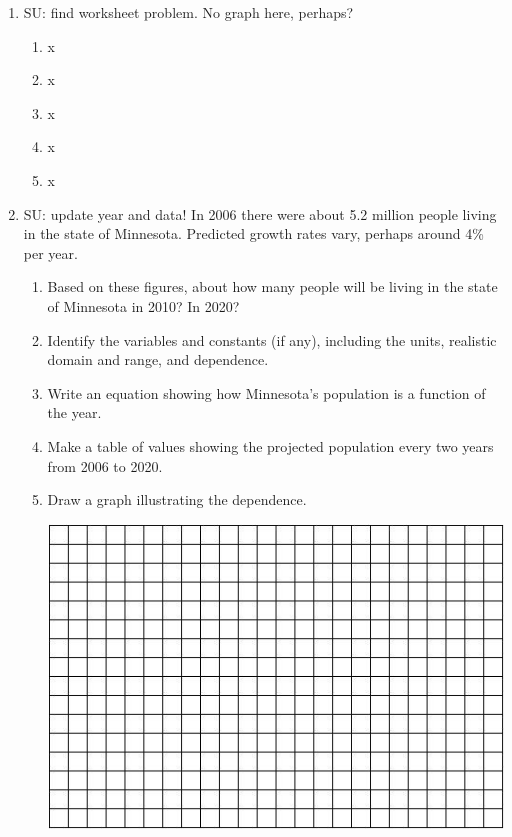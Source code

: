 \begin{enumerate}
\item SU:  find worksheet problem.  No graph here, perhaps?

\begin{enumerate}
\item x  \vfill
\item x  \vfill
\item x  \vfill
\item x  \vfill
\item x  \vfill
\end{enumerate}

\newpage

\item SU:  update year and data!  In 2006 there were about 5.2 million people living in the state of Minnesota.  Predicted growth rates vary, perhaps around 4\% per year. 

\begin{enumerate}
\item Based on these figures, about how many people will be living in the state of Minnesota in 2010?  In 2020?  \vfill
\item Identify the variables and constants (if any), including the units, realistic domain and range, and dependence.    \vfill
\item Write an equation showing how Minnesota's population is a function of the year.  \vfill
\item Make a table of values showing the projected population every two years from 2006 to 2020.  \vfill
\item Draw a graph illustrating the dependence.

\begin{center}
 {\includegraphics [width = 6in] {GraphPaper}}
\end{center}
\end{enumerate}


\end{enumerate}
